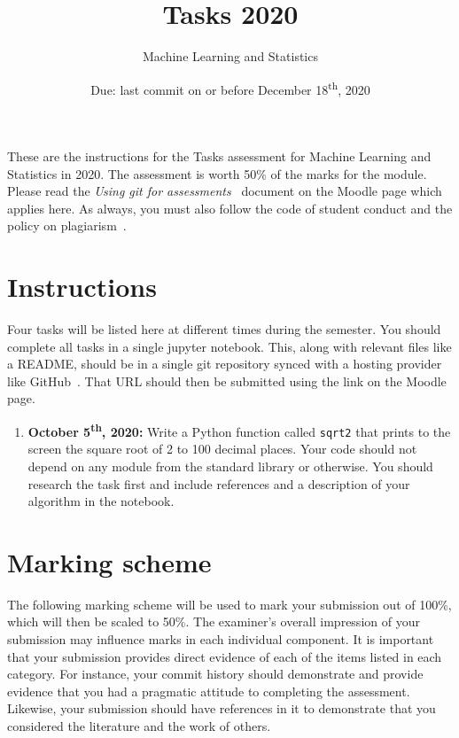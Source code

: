 \documentclass[a4paper, 12pt]{scrartcl}
\title{\vspace{-20mm}Tasks 2020}
\author{Machine Learning and Statistics}
\date{Due: last commit on or before December 18\textsuperscript{th}, 2020\vspace{-6mm}}
\begin{document}
  \maketitle

  These are the instructions for the Tasks assessment for Machine Learning and Statistics in 2020.
  The assessment is worth 50\% of the marks for the module.
  Please read the \emph{Using git for assessments}~\cite{usinggit} document on the Moodle page which applies here.
  As always, you must also follow the code of student conduct and the policy on plagiarism~\cite{gmitqaf}.

  \section*{Instructions}
    Four tasks will be listed here at different times during the semester.
    You should complete all tasks in a single jupyter notebook.
    This, along with relevant files like a README, should be in a single git repository synced with a hosting provider like GitHub~\cite{github}.
    That URL should then be submitted using the link on the Moodle page.

    \begin{enumerate}
      \item
        \textbf{October 5\textsuperscript{th}, 2020:}
        Write a Python function called \texttt{sqrt2} that prints to the screen the square root of 2 to 100 decimal places.
        Your code should not depend on any module from the standard library or otherwise.
        You should research the task first and include references and a description of your algorithm in the notebook.
    \end{enumerate}

  \newpage

  \section*{Marking scheme}
    The following marking scheme will be used to mark your submission out of 100\%, which will then be scaled to 50\%.
    The examiner's overall impression of your submission may influence marks in each individual component.
    It is important that your submission provides direct evidence of each of the items listed in each category.
    For instance, your commit history should demonstrate and provide evidence that you had a pragmatic attitude to completing the assessment.
    Likewise, your submission should have references in it to demonstrate that you considered the literature and the work of others.
  
\end{document}
